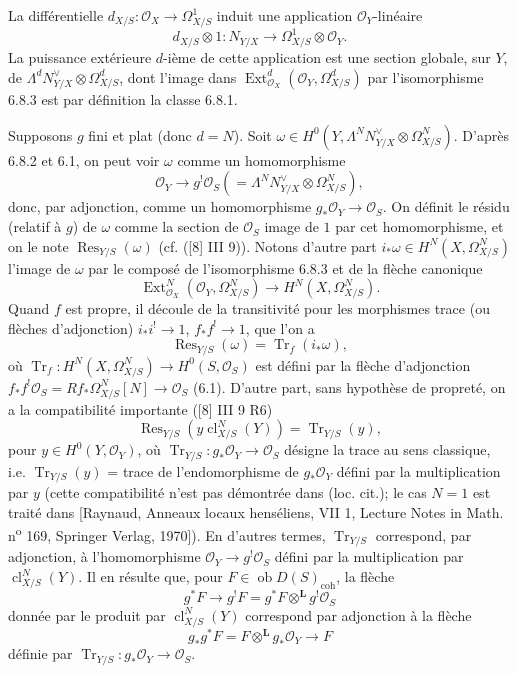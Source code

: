 \documentclass[11pt]{article}
\DeclareMathOperator{\Ext}{Ext}
\newcommand{\ob}{\operatorname{ob}}
\providecommand{\cl}{\operatorname{cl}}
\providecommand{\OO}{\mathcal{O}}
\providecommand{\LL}{\mathbf L}
\providecommand{\coh}{\mathrm{coh}}
\providecommand{\ob}{\operatorname{ob}}
\providecommand{\cl}{\operatorname{cl}}
\providecommand{\coh}{\mathrm{coh}}
\providecommand{\cl}{\operatorname{cl}}
\begin{document}
La différentielle $d_{X/S}:\OO_X\to\Omega^1_{X/S}$ induit une application $\OO_Y$-linéaire
\[
d_{X/S}\otimes 1:N_{Y/X}\longrightarrow \Omega^1_{X/S}\otimes\OO_Y.
\]
La puissance extérieure $d$-ième de cette application est une section globale, sur $Y$, de $\Lambda^d N_{Y/X}^{\vee}\otimes\Omega^d_{X/S}$, dont l'image dans $\Ext^d_{\OO_X}(\OO_Y,\Omega^d_{X/S})$ par l'isomorphisme 6.8.3 est par définition la classe 6.8.1.

Supposons $g$ fini et plat (donc $d=N$). Soit $\omega\in H^0(Y,\Lambda^N N_{Y/X}^{\vee}\otimes\Omega^N_{X/S})$. D'après 6.8.2 et 6.1, on peut voir $\omega$ comme un homomorphisme
\[
\OO_Y\longrightarrow g^!\OO_S(=\Lambda^N N_{Y/X}^{\vee}\otimes\Omega^N_{X/S}),
\]
donc, par adjonction, comme un homomorphisme $g_*\OO_Y\to\OO_S$. On définit le résidu (relatif à $g$) de $\omega$ comme la section de $\OO_S$ image de $1$ par cet homomorphisme, et on le note $\operatorname{Res}_{Y/S}(\omega)$ (cf. ([8] III 9)). Notons d'autre part $i_*\omega\in H^N(X,\Omega^N_{X/S})$ l'image de $\omega$ par le composé de l'isomorphisme 6.8.3 et de la flèche canonique
\[
\Ext^N_{\OO_X}(\OO_Y,\Omega^N_{X/S})\longrightarrow H^N(X,\Omega^N_{X/S}).
\]
Quand $f$ est propre, il découle de la transitivité pour les morphismes trace (ou flèches d'adjonction) $i_*i^!\to 1$, $f_*f^!\to 1$, que l'on a
\begin{equation}
\tag{6.8.4}
\operatorname{Res}_{Y/S}(\omega)=\operatorname{Tr}_f(i_*\omega),
\end{equation}
où $\operatorname{Tr}_f:H^N(X,\Omega^N_{X/S})\to H^0(S,\OO_S)$ est défini par la flèche d'adjonction $f_*f^!\OO_S=Rf_*\Omega^N_{X/S}[N]\to\OO_S$ (6.1). D'autre part, sans hypothèse de propreté, on a la compatibilité importante ([8] III 9 R6)
\begin{equation}
\tag{6.8.5}
\operatorname{Res}_{Y/S}(y\cl^N_{X/S}(Y))=\operatorname{Tr}_{Y/S}(y),
\end{equation}
pour $y\in H^0(Y,\OO_Y)$, où $\operatorname{Tr}_{Y/S}:g_*\OO_Y\to\OO_S$ désigne la trace au sens classique, i.e. $\operatorname{Tr}_{Y/S}(y)$ = trace de l'endomorphisme de $g_*\OO_Y$ défini par la multiplication par $y$ (cette compatibilité n'est pas démontrée dans (loc. cit.); le cas $N=1$ est traité dans [Raynaud, Anneaux locaux henséliens, VII 1, Lecture Notes in Math. n\textsuperscript{o} 169, Springer Verlag, 1970]). En d'autres termes, $\operatorname{Tr}_{Y/S}$ correspond, par adjonction, à l'homomorphisme $\OO_Y\to g^!\OO_S$ défini par la multiplication par $\cl^N_{X/S}(Y)$. Il en résulte que, pour $F\in\ob D(S)_{\coh}$, la flèche
\begin{equation}
\tag{6.8.6}
g^*F\longrightarrow g^!F=g^*F\otimes^{\LL}g^!\OO_S
\end{equation}
donnée par le produit par $\cl^N_{X/S}(Y)$ correspond par adjonction à la flèche
\begin{equation}
\tag{6.8.7}
g_*g^*F=F\otimes^{\LL}g_*\OO_Y\longrightarrow F
\end{equation}
définie par $\operatorname{Tr}_{Y/S}:g_*\OO_Y\to\OO_S$.
\end{document}
